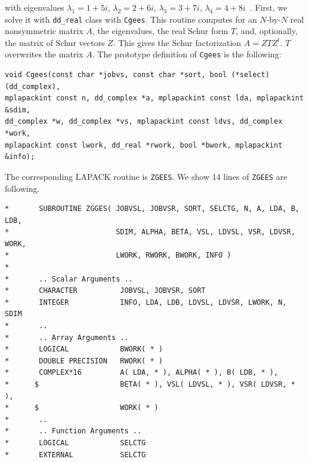 \documentclass[12pt]{article}
\begin{document}
with eigenvalues $\lambda_1 = 1+5i$, $\lambda_2 = 2+6i$, $\lambda_3 = 3+7i$, $\lambda_4=4+8i$~\cite{Gregory1969ACO}.
First, we solve it with {\tt dd\_real} class with {\tt Cgees}. This routine computes for an $N$-by-$N$
real nonsymmetric matrix $A$, the eigenvalues, the real Schur form $T$, and, optionally, the matrix of
Schur vectors $Z$. This gives the Schur factorization $A = Z T Z^t$. $ T$ overwrites the matrix $A$.
The prototype definition of {\tt Cgees} is the following:
\begin{verbatim}
void Cgees(const char *jobvs, const char *sort, bool (*select)(dd_complex),
mplapackint const n, dd_complex *a, mplapackint const lda, mplapackint &sdim,
dd_complex *w, dd_complex *vs, mplapackint const ldvs, dd_complex *work,
mplapackint const lwork, dd_real *rwork, bool *bwork, mplapackint &info);
\end{verbatim}
The corresponding LAPACK routine is {\tt ZGEES}. We show 14 lines of {\tt ZGEES} are following.
\begin{verbatim}
*       SUBROUTINE ZGGES( JOBVSL, JOBVSR, SORT, SELCTG, N, A, LDA, B, LDB,
*                         SDIM, ALPHA, BETA, VSL, LDVSL, VSR, LDVSR, WORK,
*                         LWORK, RWORK, BWORK, INFO )
*
*       .. Scalar Arguments ..
*       CHARACTER          JOBVSL, JOBVSR, SORT
*       INTEGER            INFO, LDA, LDB, LDVSL, LDVSR, LWORK, N, SDIM
*       ..
*       .. Array Arguments ..
*       LOGICAL            BWORK( * )
*       DOUBLE PRECISION   RWORK( * )
*       COMPLEX*16         A( LDA, * ), ALPHA( * ), B( LDB, * ),
*      $                   BETA( * ), VSL( LDVSL, * ), VSR( LDVSR, * ),
*      $                   WORK( * )
*       ..
*       .. Function Arguments ..
*       LOGICAL            SELCTG
*       EXTERNAL           SELCTG

\end{verbatim}
\end{document}
